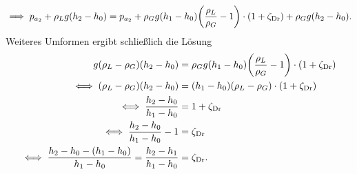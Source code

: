 \documentclass{exercise}
\begin{document}
\begin{enumerate}
\begin{align*}
        \end{align*}
        \[
            \implies p_{a_2} + \rho_L g\parentheses*{h_2 - h_0} = p_{a_2} + \rho_G g\parentheses*{h_1 - h_0}\parentheses*{\frac{\rho_L}{\rho_G} - 1} \cdot \parentheses*{1 + \zeta_{\text{Dr}}} + \rho_G g\parentheses*{h_2 - h_0}.
        \]
        Weiteres Umformen ergibt schließlich die Lösung
        \begin{align*}
            g\parentheses*{\rho_L - \rho_G}\parentheses*{h_2 - h_0} &= \rho_G g\parentheses*{h_1 - h_0}\parentheses*{\frac{\rho_L}{\rho_G} - 1} \cdot \parentheses*{1 + \zeta_{\text{Dr}}}\\
            \iff \parentheses*{\rho_L - \rho_G}\parentheses*{h_2 - h_0} &= \parentheses*{h_1 - h_0}\parentheses*{\rho_L - \rho_G} \cdot \parentheses*{1 + \zeta_{\text{Dr}}}\\
            \iff \frac{h_2 - h_0}{h_1 - h_0} &= 1 + \zeta_{\text{Dr}}\\
            \iff \frac{h_2 - h_0}{h_1 - h_0} - 1 &= \zeta_{\text{Dr}}\\
            \iff \frac{h_2 - h_0 -\parentheses*{h_1 - h_0}}{h_1 - h_0} = \frac{h_2 - h_1}{h_1 - h_0} &= \zeta_{\text{Dr}}.
        \end{align*}
    \end{enumerate}
\end{document}
